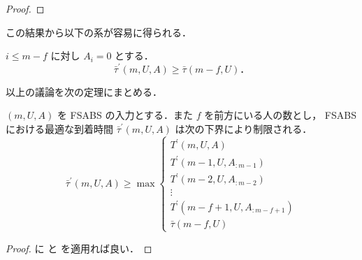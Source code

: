 \begin{proof}
\end{proof}
この結果から以下の系が容易に得られる．
\begin{corollary}\label{corollary:fsabs-lower-bound-bs}
  $i \leq m - f$ に対し $A_i = 0$ とする．
  \begin{equation}
    \bar\tau^{\prime}(m, U, A) \geq \bar\tau(m - f, U)．
  \end{equation}
\end{corollary}

以上の議論を次の定理にまとめる．
\begin{theorem}\label{theorem:fsabs-lower-bound}
  $(m, U, A)$ を FSABS の入力とする．また $f$ を前方にいる人の数とし， FSABS における最適な到着時間 $\bar\tau^\prime(m, U, A)$ は次の下界により制限される．
  \begin{equation}
    \bar\tau^\prime(m, U, A) \geq \max \begin{cases}
      T^\prime(m, U, A) \\
      T^\prime(m - 1, U, A_{:m-1}) \\
      T^\prime(m - 2, U, A_{:m-2}) \\
      \vdots \\
      T^\prime(m - f + 1, U, A_{:m-f+1}) \\
      \bar\tau(m - f, U)
    \end{cases}
  \end{equation}
\end{theorem}
\begin{proof}
   に  と  を適用れば良い．
\end{proof}